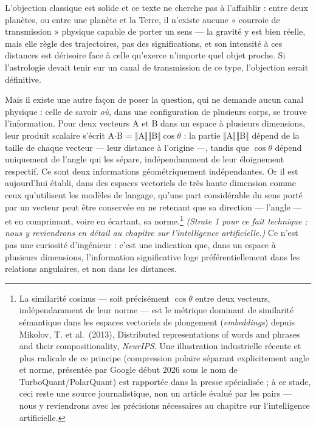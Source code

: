 \documentclass[french, 11pt, twoside, openright, a5paper]{book}
\begin{document}
L'objection classique est solide et ce texte ne cherche pas à
l'affaiblir : entre deux planètes, ou entre une planète et la Terre, il
n'existe aucune « courroie de transmission » physique capable de porter
un sens --- la gravité y est bien réelle, mais elle règle des
trajectoires, pas des significations, et son intensité à ces distances
est dérisoire face à celle qu'exerce n'importe quel objet proche. Si
l'astrologie devait tenir sur un canal de transmission de ce type,
l'objection serait définitive.

Mais il existe une autre façon de poser la question, qui ne demande
aucun canal physique : celle de savoir \emph{où}, dans une configuration
de plusieurs corps, se trouve l'information. Pour deux vecteurs A et B
dans un espace à plusieurs dimensions, leur produit scalaire s'écrit A$\cdot$B
= ‖A‖‖B‖$\cos\theta$ : la partie ‖A‖‖B‖ dépend de la taille de chaque vecteur
--- leur distance à l'origine ---, tandis que $\cos\theta$ dépend uniquement de
l'angle qui les sépare, indépendamment de leur éloignement respectif. Ce
sont deux informations géométriquement indépendantes. Or il est
aujourd'hui établi, dans des espaces vectoriels de très haute dimension
comme ceux qu'utilisent les modèles de langage, qu'une part considérable
du sens porté par un vecteur peut être conservée en ne retenant que sa
direction --- l'angle --- et en comprimant, voire en écartant, sa
norme.\footnote{La similarité cosinus --- soit précisément $\cos\theta$ entre deux vecteurs, indépendamment de leur norme --- est le métrique dominant de similarité sémantique dans les espaces vectoriels de plongement (\emph{embeddings}) depuis Mikolov, T. et al.~(2013), Distributed representations of words and phrases and their compositionality, \emph{NeurIPS}. Une illustration industrielle récente et plus radicale de ce principe (compression polaire séparant explicitement angle et norme, présentée par Google début 2026 sous le nom de TurboQuant/PolarQuant) est rapportée dans la presse spécialisée ; à ce stade, ceci reste une source journalistique, non un article évalué par les pairs --- nous y reviendrons avec les précisions nécessaires au chapitre sur l'intelligence artificielle.} \emph{(Strate 1 pour ce fait technique ; nous y reviendrons en
détail au chapitre sur l'intelligence artificielle.)} Ce n'est pas une
curiosité d'ingénieur : c'est une indication que, dans un espace à
plusieurs dimensions, l'information significative loge
préférentiellement dans les relations angulaires, et non dans les
distances.
\end{document}
